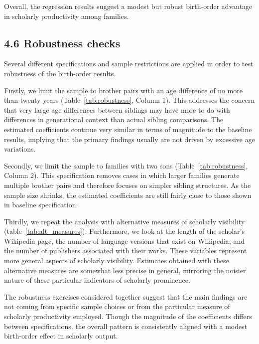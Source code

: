 Overall, the regression results suggest a modest but robust birth-order advantage in scholarly productivity among families.


\FloatBarrier

\subsection*{4.6 Robustness checks}

Several different specifications and sample restrictions are applied in order to test robustness of the birth-order results.

Firstly, we limit the sample to brother pairs with an age difference of no more than twenty years (Table~\ref{tab:robustness}, Column 1). This addresses the concern that very large age differences between siblings may have more to do with differences in generational context than actual sibling comparisons. The estimated coefficients continue very similar in terms of magnitude to the baseline results, implying that the primary findings usually are not driven by excessive age variations.

Secondly, we limit the sample to families with two sons (Table~\ref{tab:robustness}, Column 2). This specification removes cases in which larger families generate multiple brother pairs and therefore focuses on simpler sibling structures. As the sample size shrinks, the estimated coefficients are still fairly close to those shown in baseline specification.

Thirdly, we repeat the analysis with alternative measures of scholarly visibility (table~\ref{tab:alt_measures}). Furthermore, we look at the length of the scholar's Wikipedia page, the number of language versions that exist on Wikipedia, and the number of publishers associated with their works. These variables represent more general aspects of scholarly visibility. Estimates obtained with these alternative measures are somewhat less precise in general, mirroring the noisier nature of these particular indicators of scholarly prominence.

The robustness exercises considered together suggest that the main findings are not coming from specific sample choices or from the particular measure of scholarly productivity employed. Though the magnitude of the coefficients differs between specifications, the overall pattern is consistently aligned with a modest birth-order effect in scholarly output.